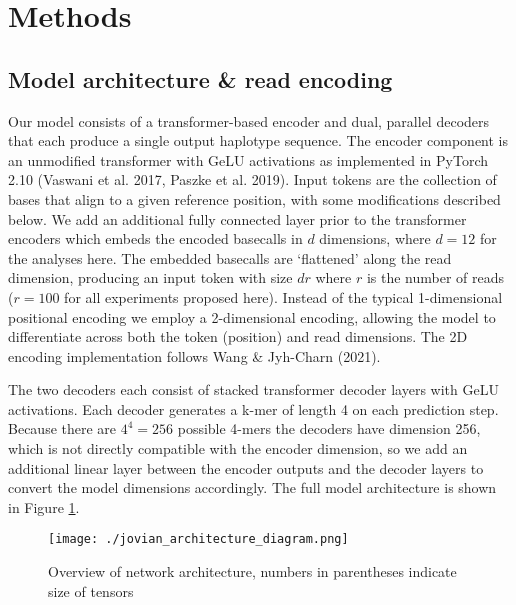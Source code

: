 \documentclass[]{article}
\begin{document}
\section{Methods}

\subsection{Model architecture \& read encoding}

Our model consists of a transformer-based encoder and dual, parallel decoders that each produce a single output haplotype sequence.  The encoder component is an unmodified transformer with GeLU activations as implemented in PyTorch 2.10 (Vaswani et al. 2017, Paszke et al. 2019). Input tokens are the collection of bases that align to a given reference position, with some modifications described below. We add an additional fully connected layer prior to the transformer encoders which embeds the encoded basecalls in $d$ dimensions, where $d=12$ for the analyses here. The embedded basecalls are `flattened' along the read dimension, producing an input token with size $dr$ where $r$ is the number of reads ($r=100$ for all experiments proposed here).  Instead of the typical 1-dimensional positional encoding we employ a 2-dimensional encoding, allowing the model to differentiate across both the token (position) and read dimensions. The 2D encoding implementation follows Wang \& Jyh-Charn (2021).

The two decoders each consist of stacked transformer decoder layers with GeLU activations. Each decoder generates a k-mer of length 4 on each prediction step. Because there are $4^4=256$ possible 4-mers the decoders have dimension 256, which is not directly compatible with the encoder dimension, so we add an additional linear layer between the encoder outputs and the decoder layers to convert the model dimensions accordingly.  The full model architecture is shown in Figure \ref{fig:architecture}. 


\begin{figure}[htp]
	\texttt{[image: ./jovian\_architecture\_diagram.png]}
	\caption{ Overview of network architecture, numbers in parentheses indicate size of tensors}
	\label{fig:architecture}
\end{figure}
\end{document}
